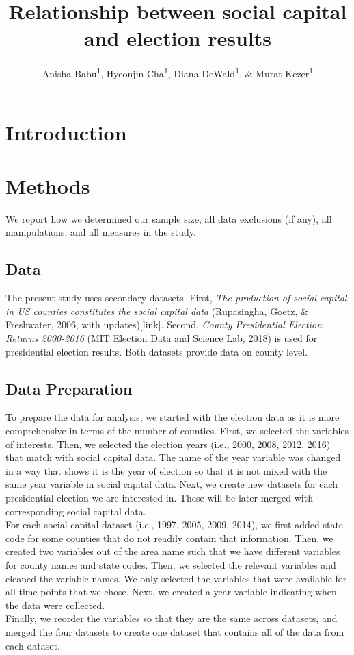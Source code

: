 \documentclass[
  english,
  man]{apa6}
\title{Relationship between social capital and election results}
\author{Anisha Babu\textsuperscript{1}, Hyeonjin Cha\textsuperscript{1}, Diana DeWald\textsuperscript{1}, \& Murat Kezer\textsuperscript{1}}
\date{}
\affiliation{\vspace{0.5cm}\textsuperscript{1} University of Oregon}
\begin{document}
\maketitle

\hypertarget{introduction}{%
\section{Introduction}\label{introduction}}

\hypertarget{methods}{%
\section{Methods}\label{methods}}

We report how we determined our sample size, all data exclusions (if any), all manipulations, and all measures in the study.

\hypertarget{data}{%
\subsection{Data}\label{data}}

The present study uses secondary datasets. First, \emph{The production of social capital in US counties constitutes the social capital data} (Rupasingha, Goetz, \& Freshwater, 2006, with updates){[}link{]}. Second, \emph{County Presidential Election Returns 2000-2016} (MIT Election Data and Science Lab, 2018) is used for presidential election results. Both datasets provide data on county level.

\hypertarget{data-preparation}{%
\subsection{Data Preparation}\label{data-preparation}}

To prepare the data for analysis, we started with the election data as it is more comprehensive in terms of the number of counties. First, we selected the variables of interests. Then, we selected the election years (i.e., 2000, 2008, 2012, 2016) that match with social capital data. The name of the year variable was changed in a way that shows it is the year of election so that it is not mixed with the same year variable in social capital data. Next, we create new datasets for each presidential election we are interested in. These will be later merged with corresponding social capital data.\\
For each social capital dataset (i.e., 1997, 2005, 2009, 2014), we first added state code for some counties that do not readily contain that information. Then, we created two variables out of the area name such that we have different variables for county names and state codes. Then, we selected the relevant variables and cleaned the variable names. We only selected the variables that were available for all time points that we chose. Next, we created a year variable indicating when the data were collected.\\
Finally, we reorder the variables so that they are the same across datasets, and merged the four datasets to create one dataset that contains all of the data from each dataset.
\end{document}
